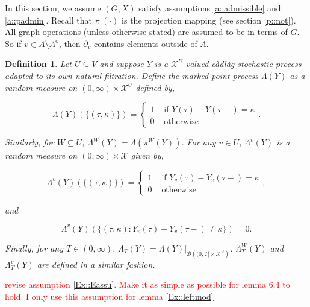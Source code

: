 \documentclass[12pt]{article}
\newcommand{\mc}{\mathcal}
\newcommand{\ms}{\mathscr}
\newcommand{\te}{\text}
\newcommand{\tr}{\textcolor{red}}
\newcommand{\ind}{\hspace{24pt}}
\newcommand{\sta}{\mc{X}}							%
\newcommand{\neigh}[1]{\partial_{#1}}				%
\newcommand{\Xf}{X}									%
\newcommand{\proj}{\pi}								%
\newcommand{\vind}[1]{_{#1}}						%
\newcommand{\tme}[1]{(#1)}							%
\newcommand{\vpara}[1]{^{#1}}						%
\newcommand{\tpara}[1]{_{#1}}						%
\newcommand{\Xg}{Y}									%
\newcommand{\inte}[1]{{#1}^\mathrm{o}}				%
\newcommand{\pmap}{\Lambda}							%
\newcommand{\rt}{\tau}								%
\renewcommand{\mark}{\kappa}						%
\newtheorem{defn}[thms]{Definition}
\begin{document}
\ind In this section, we assume \((G,\Xf)\) satisfy assumptions \ref{a::admissible} and \ref{a::padmin}. Recall that \(\proj\vpara{\cdot}\tpara{\cdot}(\cdot)\) is the projection mapping (see section \ref{p::not}). All graph operations (unless otherwise stated) are assumed to be in terms of \(G\). So if \(v \in A\setminus\inte{A}\), then \(\neigh{v}\) contains elements outside of \(A\).

\begin{defn}
Let \(U\subseteq V\) and suppose \(\Xg\) is a \(\sta^U\)-valued c\`adl\`ag stochastic process adapted to its own natural filtration. Define the marked point process \(\pmap(\Xg)\) as a random measure on \((0,\infty) \times \sta^U\) defined by,

\[\pmap(\Xg)(\{(\rt,\mark)\}) = \begin{cases}
1 &\te{ if } \Xg\tme{\rt} - \Xg\tme{\rt-} = \mark\\
0 &\te{ otherwise}
\end{cases}.\]

Similarly, for \(W \subseteq U\), \(\pmap\vpara{W}(\Xg) = \pmap\left(\proj\vpara{W}(\Xg)\right)\). For any \(v\in U\), \(\pmap\vpara{v}(\Xg)\) is a random measure on \((0,\infty) \times \sta\) given by,

\[\pmap\vpara{v}(\Xg)(\{(\rt,\mark)\}) = \begin{cases}
1 &\te{ if } \Xg\vind{v}\tme{\rt} - \Xg\vind{v}\tme{\rt-} = \mark\\
0 &\te{ otherwise}
\end{cases},\]

and

\[\pmap\vpara{v}(\Xg)(\{(\rt,\mark): \Xg\vind{v}\tme{\rt} - \Xg\vind{v}\tme{\rt-} \neq \mark\}) = 0.\]

Finally, for any \(T\in (0,\infty)\), \(\pmap\tpara{T}(\Xg) = \pmap(\Xg)|_{\ms{B}\left((0,T]\times\sta^U\right)}\). \(\pmap\vpara{W}\tpara{T}(\Xg)\) and \(\pmap\vpara{v}\tpara{T}(\Xg)\) are defined in a similar fashion.
\label{Ex::pmap}
\end{defn}

\ind \tr{revise assumption \ref{Ex::Eassu}. Make it as simple as possible for lemma 6.4 to hold. I only use this assumption for lemma \ref{Ex::leftmod}}
\end{document}
